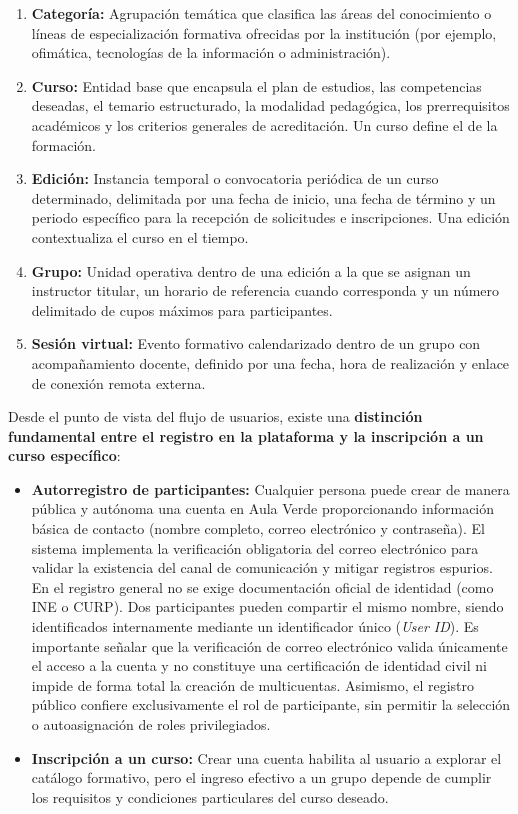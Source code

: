 \begin{enumerate}
    \item \textbf{Categoría:} Agrupación temática que clasifica las áreas del conocimiento o líneas de especialización formativa ofrecidas por la institución (por ejemplo, ofimática, tecnologías de la información o administración).
    \item \textbf{Curso:} Entidad base que encapsula el plan de estudios, las competencias deseadas, el temario estructurado, la modalidad pedagógica, los prerrequisitos académicos y los criterios generales de acreditación. Un curso define el  de la formación.
    \item \textbf{Edición:} Instancia temporal o convocatoria periódica de un curso determinado, delimitada por una fecha de inicio, una fecha de término y un periodo específico para la recepción de solicitudes e inscripciones. Una edición contextualiza el curso en el tiempo.
    \item \textbf{Grupo:} Unidad operativa dentro de una edición a la que se asignan un instructor titular, un horario de referencia cuando corresponda y un número delimitado de cupos máximos para participantes.
    \item \textbf{Sesión virtual:} Evento formativo calendarizado dentro de un grupo con acompañamiento docente, definido por una fecha, hora de realización y enlace de conexión remota externa.
\end{enumerate}

Desde el punto de vista del flujo de usuarios, existe una \textbf{distinción fundamental entre el registro en la plataforma y la inscripción a un curso específico}:

\begin{itemize}
    \item \textbf{Autorregistro de participantes:} Cualquier persona puede crear de manera pública y autónoma una cuenta en Aula Verde proporcionando información básica de contacto (nombre completo, correo electrónico y contraseña). El sistema implementa la verificación obligatoria del correo electrónico para validar la existencia del canal de comunicación y mitigar registros espurios. En el registro general no se exige documentación oficial de identidad (como INE o CURP). Dos participantes pueden compartir el mismo nombre, siendo identificados internamente mediante un identificador único (\textit{User ID}). Es importante señalar que la verificación de correo electrónico valida únicamente el acceso a la cuenta y no constituye una certificación de identidad civil ni impide de forma total la creación de multicuentas. Asimismo, el registro público confiere exclusivamente el rol de participante, sin permitir la selección o autoasignación de roles privilegiados.
    \item \textbf{Inscripción a un curso:} Crear una cuenta habilita al usuario a explorar el catálogo formativo, pero el ingreso efectivo a un grupo depende de cumplir los requisitos y condiciones particulares del curso deseado.
\end{itemize}

